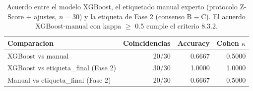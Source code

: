 \begin{table}[ht]
\centering
\small
\caption{Acuerdo entre el modelo XGBoost, el etiquetado manual experto (protocolo Z-Score + ajustes, $n=30$) y la etiqueta de Fase 2 (consenso B$\equiv$C). El acuerdo XGBoost-manual con kappa $\geq$ 0.5 cumple el criterio 8.3.2.}
\label{tab:etiquetado_manual_resumen}
\begin{tabular}{l rrr}
\toprule
Comparacion & Coincidencias & Accuracy & Cohen $\kappa$ \\
\midrule
XGBoost vs manual & 20/30 & 0.6667 & 0.5000 \\
XGBoost vs etiqueta\_final (Fase 2) & 30/30 & 1.0000 & 1.0000 \\
Manual vs etiqueta\_final (Fase 2) & 20/30 & 0.6667 & 0.5000 \\
\bottomrule
\end{tabular}
\end{table}
